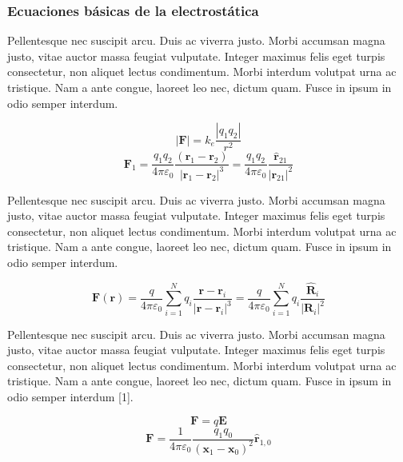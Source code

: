 \documentclass[12pt]{article}
\begin{document}
\subsubsection{Ecuaciones básicas de la electrostática}

Pellentesque nec suscipit arcu. Duis ac viverra justo. Morbi accumsan magna justo, vitae auctor massa feugiat vulputate. Integer maximus felis eget turpis consectetur, non aliquet lectus condimentum. Morbi interdum volutpat urna ac tristique. Nam a ante congue, laoreet leo nec, dictum quam. Fusce in ipsum in odio semper interdum. 

\begin{equation}
    |\boldsymbol{F}|=k_{e} \frac{\left|q_{1} q_{2}\right|}{r^{2}}
\end{equation}
\begin{equation}
    \boldsymbol{F}_{1}=\frac{q_{1} q_{2}}{4 \pi \varepsilon_{0}} \frac{\left(\boldsymbol{r}_{1}-\boldsymbol{r}_{2}\right)}{\left|\boldsymbol{r}_{1}-\boldsymbol{r}_{2}\right|^{3}}=\frac{q_{1} q_{2}}{4 \pi \varepsilon_{0}} \frac{\widehat{\boldsymbol{r}}_{21}}{\left|\boldsymbol{r}_{21}\right|^{2}}
\end{equation}

\medskip

Pellentesque nec suscipit arcu. Duis ac viverra justo. Morbi accumsan magna justo, vitae auctor massa feugiat vulputate. Integer maximus felis eget turpis consectetur, non aliquet lectus condimentum. Morbi interdum volutpat urna ac tristique. Nam a ante congue, laoreet leo nec, dictum quam. Fusce in ipsum in odio semper interdum. 

\begin{equation}
    \boldsymbol{F}(\boldsymbol{r})=\frac{q}{4 \pi \varepsilon_{0}} \sum_{i=1}^{N} q_{i} \frac{\boldsymbol{r}-\boldsymbol{r}_{i}}{\left|\boldsymbol{r}-\boldsymbol{r}_{i}\right|^{3}}=\frac{q}{4 \pi \varepsilon_{0}} \sum_{i=1}^{N} q_{i} \frac{\widehat{\boldsymbol{R}}_{i}}{\left|\boldsymbol{R}_{i}\right|^{2}}
\end{equation}

Pellentesque nec suscipit arcu. Duis ac viverra justo. Morbi accumsan magna justo, vitae auctor massa feugiat vulputate. Integer maximus felis eget turpis consectetur, non aliquet lectus condimentum. Morbi interdum volutpat urna ac tristique. Nam a ante congue, laoreet leo nec, dictum quam. Fusce in ipsum in odio semper interdum [1]. 

\medskip

\begin{equation}
    \mathbf{F}=q \mathbf{E}
\end{equation}
\begin{equation}
    \boldsymbol{F}=\frac{1}{4 \pi \varepsilon_{0}} \frac{q_{1} q_{0}}{\left(\boldsymbol{x}_{1}-\boldsymbol{x}_{0}\right)^{2}} \hat{\boldsymbol{r}}_{1,0}
\end{equation}
\end{document}
